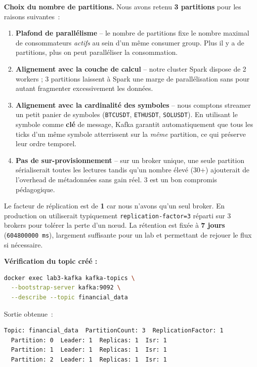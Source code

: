 \documentclass{RapportINPTCLOUD}
\begin{document}
\textbf{Choix du nombre de partitions.} Nous avons retenu \textbf{3 partitions} pour les raisons suivantes~:
\begin{enumerate}[leftmargin=2em]
    \item \textbf{Plafond de parall\'{e}lisme} -- le nombre de partitions fixe le nombre maximal de consommateurs \textit{actifs} au sein d'un m\^{e}me consumer group. Plus il y a de partitions, plus on peut paralléliser la consommation.
    \item \textbf{Alignement avec la couche de calcul} -- notre cluster Spark dispose de 2 workers ; 3 partitions laissent \`{a} Spark une marge de parall\'{e}lisation sans pour autant fragmenter excessivement les donn\'{e}es.
    \item \textbf{Alignement avec la cardinalit\'{e} des symboles} -- nous comptons streamer un petit panier de symboles (\texttt{BTCUSDT}, \texttt{ETHUSDT}, \texttt{SOLUSDT}). En utilisant le symbole comme \textbf{cl\'{e}} de message, Kafka garantit automatiquement que tous les ticks d'un m\^{e}me symbole atterrissent sur la \textit{m\^{e}me} partition, ce qui pr\'{e}serve leur ordre temporel.
    \item \textbf{Pas de sur-provisionnement} -- sur un broker unique, une seule partition s\'{e}rialiserait toutes les lectures tandis qu'un nombre \'{e}lev\'{e} (30+) ajouterait de l'overhead de m\'{e}tadonn\'{e}es sans gain r\'{e}el. 3 est un bon compromis p\'{e}dagogique.
\end{enumerate}

Le facteur de r\'{e}plication est de \textbf{1} car nous n'avons qu'un seul broker. En production on utiliserait typiquement \texttt{replication-factor=3} r\'{e}parti sur 3 brokers pour tol\'{e}rer la perte d'un n\oe{}ud. La r\'{e}tention est fix\'{e}e \`{a} \textbf{7 jours} (\texttt{604800000 ms}), largement suffisante pour un lab et permettant de rejouer le flux si n\'{e}cessaire.

\textbf{V\'{e}rification du topic cr\'{e}\'{e} :}
\begin{lstlisting}[style=code, language=bash]
docker exec lab3-kafka kafka-topics \
  --bootstrap-server kafka:9092 \
  --describe --topic financial_data
\end{lstlisting}
Sortie obtenue~:
\begin{lstlisting}[style=code]
Topic: financial_data  PartitionCount: 3  ReplicationFactor: 1
  Partition: 0  Leader: 1  Replicas: 1  Isr: 1
  Partition: 1  Leader: 1  Replicas: 1  Isr: 1
  Partition: 2  Leader: 1  Replicas: 1  Isr: 1
\end{lstlisting}
\end{document}
